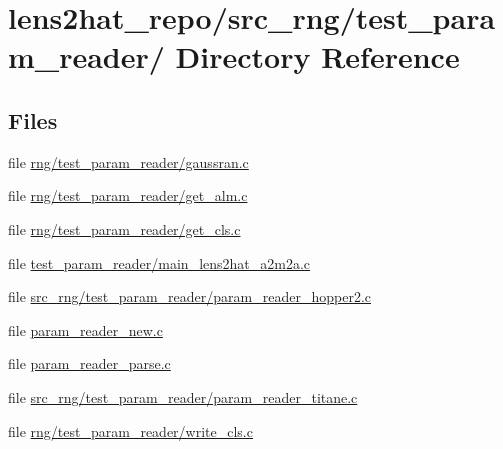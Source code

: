 \section{lens2hat\-\_\-repo/src\-\_\-rng/test\-\_\-param\-\_\-reader/ Directory Reference}
\label{dir_a59f438bf73ac9ad1cd2df601a7bbed1}
\subsection*{Files}
\begin{DoxyCompactItemize}
\item 
file \hyperlink{rng_2test__param__reader_2gaussran_8c}{rng/test\-\_\-param\-\_\-reader/gaussran.\-c}
\item 
file \hyperlink{rng_2test__param__reader_2get__alm_8c}{rng/test\-\_\-param\-\_\-reader/get\-\_\-alm.\-c}
\item 
file \hyperlink{rng_2test__param__reader_2get__cls_8c}{rng/test\-\_\-param\-\_\-reader/get\-\_\-cls.\-c}
\item 
file \hyperlink{test__param__reader_2main__lens2hat__a2m2a_8c}{test\-\_\-param\-\_\-reader/main\-\_\-lens2hat\-\_\-a2m2a.\-c}
\item 
file \hyperlink{src__rng_2test__param__reader_2param__reader__hopper2_8c}{src\-\_\-rng/test\-\_\-param\-\_\-reader/param\-\_\-reader\-\_\-hopper2.\-c}
\item 
file \hyperlink{param__reader__new_8c}{param\-\_\-reader\-\_\-new.\-c}
\item 
file \hyperlink{param__reader__parse_8c}{param\-\_\-reader\-\_\-parse.\-c}
\item 
file \hyperlink{src__rng_2test__param__reader_2param__reader__titane_8c}{src\-\_\-rng/test\-\_\-param\-\_\-reader/param\-\_\-reader\-\_\-titane.\-c}
\item 
file \hyperlink{rng_2test__param__reader_2write__cls_8c}{rng/test\-\_\-param\-\_\-reader/write\-\_\-cls.\-c}
\end{DoxyCompactItemize}
